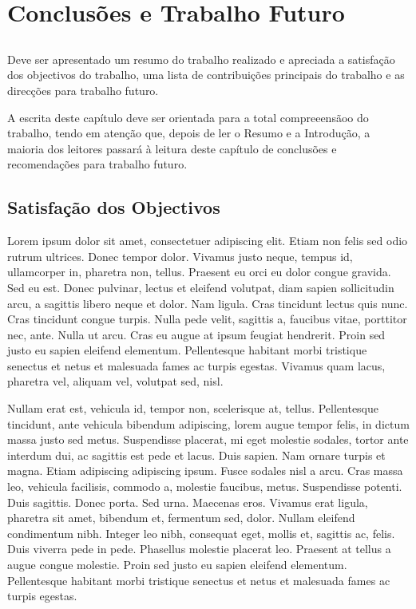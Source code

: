 \chapter{Conclusões e Trabalho Futuro} \label{chap:concl}

\section*{}

Deve ser apresentado um resumo do trabalho realizado e apreciada a
satisfação dos objectivos do trabalho, uma lista de contribuições
principais do trabalho e as direcções para trabalho futuro.

A escrita deste capítulo deve ser orientada para a total compreeensãoo
do trabalho, tendo em atenção que, depois de ler o Resumo e a
Introdução, a maioria dos leitores passará à leitura deste capítulo de
conclusões e recomendações para trabalho futuro.

\section{Satisfação dos Objectivos}

Lorem ipsum dolor sit amet, consectetuer adipiscing elit. Etiam non
felis sed odio rutrum ultrices. Donec tempor dolor. Vivamus justo
neque, tempus id, ullamcorper in, pharetra non, tellus. Praesent eu
orci eu dolor congue gravida. Sed eu est. Donec pulvinar, lectus et
eleifend volutpat, diam sapien sollicitudin arcu, a sagittis libero
neque et dolor. Nam ligula. Cras tincidunt lectus quis nunc. Cras
tincidunt congue turpis. Nulla pede velit, sagittis a, faucibus vitae,
porttitor nec, ante. Nulla ut arcu. Cras eu augue at ipsum feugiat
hendrerit. Proin sed justo eu sapien eleifend elementum. Pellentesque
habitant morbi tristique senectus et netus et malesuada fames ac
turpis egestas. Vivamus quam lacus, pharetra vel, aliquam vel,
volutpat sed, nisl. 

Nullam erat est, vehicula id, tempor non, scelerisque at,
tellus. Pellentesque tincidunt, ante vehicula bibendum adipiscing,
lorem augue tempor felis, in dictum massa justo sed metus. Suspendisse
placerat, mi eget molestie sodales, tortor ante interdum dui, ac
sagittis est pede et lacus. Duis sapien. Nam ornare turpis et
magna. Etiam adipiscing adipiscing ipsum. Fusce sodales nisl a
arcu. Cras massa leo, vehicula facilisis, commodo a, molestie
faucibus, metus. Suspendisse potenti. Duis sagittis. Donec porta. Sed
urna. Maecenas eros. Vivamus erat ligula, pharetra sit amet, bibendum
et, fermentum sed, dolor. Nullam eleifend condimentum nibh. Integer
leo nibh, consequat eget, mollis et, sagittis ac, felis. Duis viverra
pede in pede. Phasellus molestie placerat leo. Praesent at tellus a
augue congue molestie. Proin sed justo eu sapien eleifend
elementum. Pellentesque habitant morbi tristique senectus et netus et
malesuada fames ac turpis egestas. 

